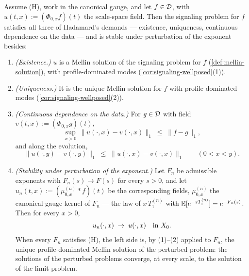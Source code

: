 \begin{corollary}\label{cor:signaling-hadamard}
Assume (H), work in the canonical gauge, and let $f \in \mathcal{D}$, with
$u(t,x) := (\Phi_{0,x}f)(t)$ the scale-space field. Then the signaling problem for $f$
satisfies all three of Hadamard's demands --- existence, uniqueness, continuous dependence
on the data --- and is stable under perturbation of the exponent besides:
\begin{enumerate}
\item \emph{(Existence.)} $u$ is a Mellin solution of the signaling problem for $f$
(\ref{def:mellin-solution}), with profile-dominated modes (\ref{cor:signaling-wellposed}(1)).
\item \emph{(Uniqueness.)} It is the unique Mellin solution for $f$ with profile-dominated
modes (\ref{cor:signaling-wellposed}(2)).
\item \emph{(Continuous dependence on the data.)} For $g \in \mathcal{D}$ with field
$v(t,x) := (\Phi_{0,x}g)(t)$,
\[
  \sup_{x>0}\,\|u(\cdot,x) - v(\cdot,x)\|_1 \;\le\; \|f - g\|_1,
\]
and along the evolution,
\[
  \|u(\cdot,y) - v(\cdot,y)\|_1 \;\le\; \|u(\cdot,x) - v(\cdot,x)\|_1 \qquad (0 < x < y).
\]
\item \emph{(Stability under perturbation of the exponent.)} Let $F_n$ be admissible
exponents with $F_n(s) \to F(s)$ for every $s > 0$, and let
$u_n(t,x) := (\mu^{(n)}_{0,x} * f)(t)$ be the corresponding fields, $\mu^{(n)}_{0,x}$ the
canonical-gauge kernel of $F_n$ --- the law of $x\,T^{(n)}_1$ with
$\mathbb{E}[e^{-sT^{(n)}_1}] = e^{-F_n(s)}$. Then for every $x > 0$,
\[
  u_n(\cdot, x) \;\to\; u(\cdot, x) \quad\text{in } X_0 .
\]
When every $F_n$ satisfies (H), the left side is, by (1)--(2) applied to $F_n$, the unique
profile-dominated Mellin solution of the perturbed problem: the solutions of the perturbed
problems converge, at every scale, to the solution of the limit problem.

\end{enumerate}
\end{corollary}
